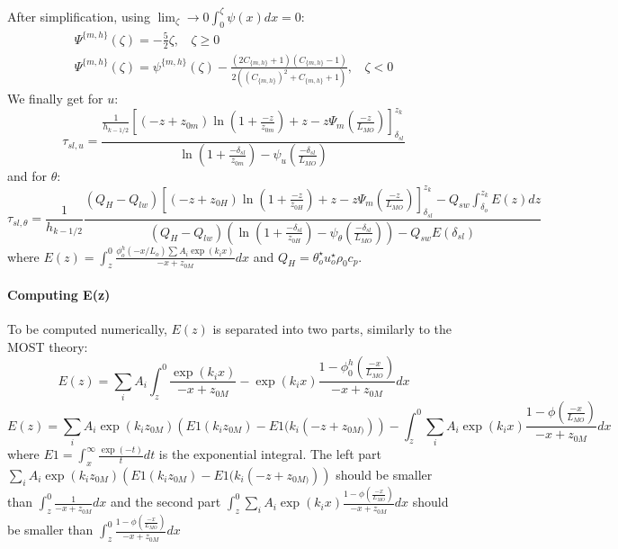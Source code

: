 After simplification, using $\lim_\zeta\to0 \int_0^\zeta\psi(x)dx = 0$:
\begin{equation}
\begin{aligned}
\Psi^{\{m,h\}}(\zeta)= -\frac{5}{2}\zeta, ~~~~ \zeta \geq 0 \\
	\Psi^{\{m,h\}}(\zeta)=
	\psi^{\{m,h\}}(\zeta)
	- \frac{(2C_{\{m,h\}}+1)(C_{\{m,h\}} - 1)}
	{2\left((C_{\{m,h\}})^2 + C_{\{m,h\}} + 1\right)}, ~~~~ \zeta < 0
\end{aligned}
\end{equation}
We finally get for $u$:
\begin{equation}
	\tau_{sl, u} = \frac{\frac{1}{{h_{k-1/2}}}
    \left[
	    (-z+z_{0m})\ln(1+\frac{-z}{z_{0m}})+z
    -
    z \Psi_m(\frac{-z}{L_{MO}}) \right]_{\delta_{sl}}^{z_k}
    }{\ln(1+\frac{-\delta_{sl}}{z_{0m}})- \psi_u(\frac{-\delta_{sl}}{L_{MO}})
    }
\end{equation}
and for $\theta$:
\begin{equation}
	\tau_{sl, \theta} =  \frac{1}{{h_{k-1/2}}}\frac{(Q_H -
		Q_{lw})
    \left[
	    (-z+z_{0H})\ln(1+\frac{-z}{z_{0H}})+z
    -
    z \Psi_m(\frac{-z}{L_{MO}}) \right]_{\delta_{sl}}^{z_k}
	- Q_{sw} \int_{\delta_o}^{z_k}
		E(z) dz
    }{(Q_H - Q_{lw})
	    \left(\ln(1+\frac{-\delta_{sl}}{z_{0H}})-
	    \psi_\theta(\frac{-\delta_{sl}}{L_{MO}})\right)
	    -Q_{sw} E(\delta_{sl})
    }
\end{equation}
where $E(z) = \int_{z}^0 \frac{\phi^h_o(-x/L_o)
		\sum A_i \exp (k_i x)
		}{-x + z_{0M}}dx$
and $Q_H = \theta_o^{\star}u_o^{\star}\rho_0 c_p$.
\paragraph{Computing E(z)}
To be computed numerically, $E(z)$ is separated into two parts,
similarly to the MOST theory:
\begin{equation}
	E(z) = \sum_i A_i\int_z^0
	\frac{\exp(k_i x)}{-x + z_{0M}}
	- \exp(k_i x)\frac{1 - \phi_0^h(\frac{-x}{L_{MO}})}
	{-x + z_{0M}}
	dx
\end{equation}
\begin{equation}
	E(z) = \sum_i A_i \exp(k_i z_{0M}) \left(E1(k_i z_{0M})
	- E1(k_i (-z+z_{0M)})\right)
	- \int_{z}^0 \sum_i A_i \exp(k_i x)
	\frac{1-\phi(\frac{-x}{L_{MO}})}{-x+z_{0M}} dx
\end{equation}
where $E1=\int_x^\infty \frac{\exp(-t)}{t}dt$ is the exponential
integral.
The left part $\sum_i A_i \exp(k_i z_{0M}) \left(E1(k_i z_{0M})
	- E1(k_i (-z+z_{0M)})\right)$ should be smaller than
$\int_z^0 \frac{1}{-x + z_{0M}}dx$
and the second part $\int_{z}^0 \sum_i A_i \exp(k_i x)
	\frac{1-\phi(\frac{-x}{L_{MO}})}{-x+z_{0M}} dx$
	should be smaller than $\int_{z}^0
	\frac{1-\phi(\frac{-x}{L_{MO}})}{-x+z_{0M}} dx$
